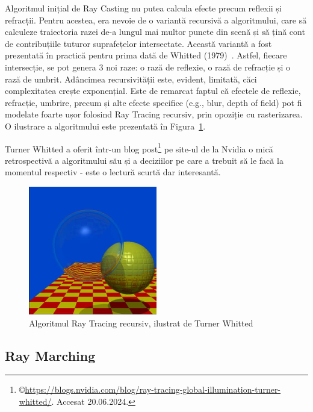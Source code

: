 \documentclass[12pt,a4paper]{report}
\numberwithin{equation}{section} %
\begin{document}
Algoritmul inițial de Ray Casting nu putea calcula efecte precum reflexii și refracții.
Pentru acestea, era nevoie de o variantă recursivă a algoritmului, care să calculeze
traiectoria razei de-a lungul mai multor puncte din scenă și să țină cont de
contribuțiile tuturor suprafețelor intersectate. Această variantă a fost prezentată
în practică pentru prima dată de Whitted (1979)~\cite{Whitted}. Astfel, fiecare
intersecție, se pot genera 3 noi raze: o rază de reflexie, o rază de refracție și
o rază de umbrit. Adâncimea recursivității este, evident, limitată, căci complexitatea
crește exponențial. Este de remarcat faptul că efectele de reflexie, refracție, umbrire,
precum și alte efecte specifice (e.g., blur, depth of field) pot fi modelate foarte
ușor folosind Ray Tracing recursiv, prin opoziție cu rasterizarea. O ilustrare
a algoritmului este prezentată în Figura~\ref{fig:whitted}.

Turner Whitted a oferit
într-un blog post\footnote{\label{fn:whitted}\copyright\url{https://blogs.nvidia.com/blog/ray-tracing-global-illumination-turner-whitted/}. Accesat 20.06.2024.}
pe site-ul de la Nvidia o mică retrospectivă a algoritmului său și a deciziilor
pe care a trebuit să le facă la momentul respectiv - este o lectură scurtă dar
interesantă.

\begin{figure}[ht]
	\centering
	\includegraphics[width=0.5\textwidth]{pics/whitted.jpg}
	\caption{Algoritmul Ray Tracing recursiv, ilustrat de Turner Whitted\protect{}}
	\label{fig:whitted}
\end{figure}

\subsection*{Ray Marching}\label{sec:raymarching}
\end{document}
